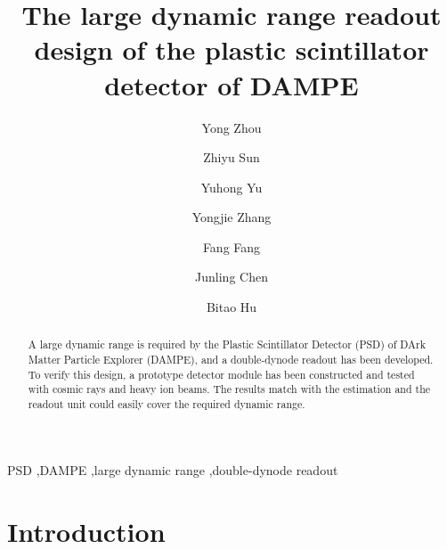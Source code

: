 \documentclass[preprint, times]{elsarticle}
\begin{document}
\begin{frontmatter}

\title{The large dynamic range readout design of the plastic scintillator detector of DAMPE}

\author[imp,lzu,ucas]{Yong Zhou}
\author[imp]{Zhiyu Sun}

\author[imp]{Yuhong Yu}

\author[imp]{Yongjie Zhang}
\author[imp]{Fang Fang}
\author[imp]{Junling Chen}

\author[lzu]{Bitao Hu}

\address[imp]{Institute of Modern Physics, Chinese Academy of Sciences,  509 Nanchang Road,  Lanzhou,  730000,  P.R.China}
\address[lzu]{School of Nuclear Science and Technology,  Lanzhou University,  222 South Tianshui Road,  Lanzhou,  730000,  P.R.China}
\address[ucas]{Graduate University of the Chinese Academy of Sciences,  19A Yuquan Road,  Beijing,  100049,  P.R.China}
\begin{abstract}

A large dynamic range is required by the Plastic Scintillator Detector (PSD) of DArk Matter Particle Explorer (DAMPE), and a double-dynode readout has been developed. To verify this design, a prototype detector module has been constructed and tested with cosmic rays and heavy ion beams.
The results match with the estimation and the readout unit could easily cover the required dynamic range.

\end{abstract}

\begin{keyword}
PSD
\sep DAMPE
\sep large dynamic range
\sep double-dynode readout


\end{keyword}

\end{frontmatter}

\linenumbers
\section{Introduction}
\label{sec:introduction}
\end{document}
